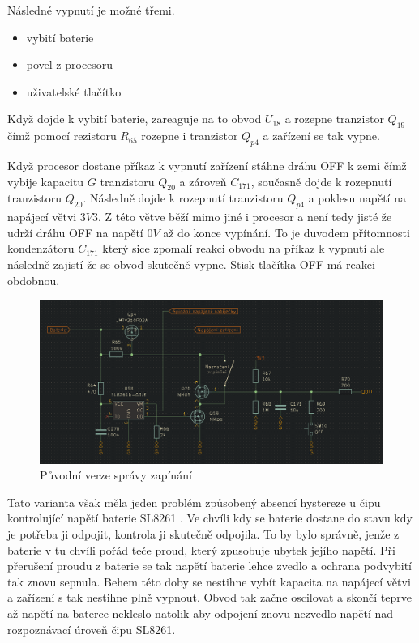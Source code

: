 Následné vypnutí je možné třemi.
\begin{itemize}
    \item vybití baterie
    \item povel z procesoru
    \item uživatelské tlačítko
\end{itemize}

Když dojde k vybití baterie, zareaguje na to obvod \(U_{18}\) a rozepne tranzistor \(Q_{19}\) čímž pomocí rezistoru \(R_{65}\) rozepne i tranzistor \(Q_{p4}\) a zařízení se tak vypne.

Když procesor dostane příkaz k vypnutí zařízení stáhne dráhu OFF k zemi čímž vybije kapacitu \(G\) tranzistoru \(Q_{20}\) a zároveň \(C_{171}\), současně dojde k rozepnutí tranzistoru \(Q_{20}\).
Následně dojde k rozepnutí tranzistoru \(Q_{p4}\) a poklesu napětí na napájecí větvi \(3V3\).
Z této větve běží mimo jiné i procesor a není tedy jisté že udrží dráhu OFF na napětí \(0V\) až do konce vypínání.
To je duvodem přítomnosti kondenzátoru \(C_{171}\) který sice zpomalí reakci obvodu na příkaz k vypnutí ale následně zajistí že se obvod skutečně vypne.
Stisk tlačítka OFF má reakci obdobnou. 


\begin{figure}[h!]
    \centering
    \includegraphics[width=\textwidth]{text/PraktickaCast/img/stary_power_manager.png}
    \caption{Původní verze správy zapínání}
    \label{fig:stary_PoverManager}
\end{figure}

Tato varianta však měla jeden problém způsobený absencí hystereze u čipu kontrolující napětí baterie SL8261 \cite{SL8261}.
Ve chvíli kdy se baterie dostane do stavu kdy je potřeba ji odpojit, kontrola ji skutečně odpojila.
To by bylo správně, jenže z baterie v tu chvíli pořád teče proud, který zpusobuje ubytek jejího napětí.
Při přerušení proudu z baterie se tak napětí baterie lehce zvedlo a ochrana podvybití tak znovu sepnula.
Behem této doby se nestihne vybít kapacita na napájecí větvi a zařízení s tak nestihne plně vypnout.
Obvod tak začne oscilovat a skončí teprve až napětí na baterce nekleslo natolik aby odpojení znovu nezvedlo napětí nad rozpoznávací úroveň čipu SL8261.

